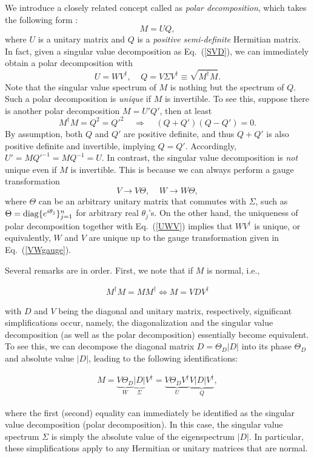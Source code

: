\documentclass{tADP2e}
\theoremstyle{plain}
\newcommand{\eqn}[1]{
\begin{eqnarray}
	#1
\end{eqnarray}
}
\theoremstyle{plain}
\theoremstyle{definition}
\begin{document}
We introduce a closely related concept called as \emph{polar decomposition}, which takes the following form \cite{BCH15}:
\begin{equation}
M=UQ,
\label{PD}
\end{equation}
where $U$ is a unitary matrix and $Q$ is a \emph{positive semi-definite} Hermitian matrix. In fact, given a singular value decomposition as Eq.~(\ref{SVD}), we can immediately obtain a polar decomposition with 
\begin{equation}
U=WV^\dag,\;\;\;\;Q=V\Sigma V^\dag\equiv \sqrt{M^\dag M}. 
\label{UWV}
\end{equation}
Note that the singular value spectrum of $M$ is nothing but the spectrum of $Q$. Such a polar decomposition is \emph{unique} if $M$ is invertible. To see this, suppose there is another polar decomposition $M=U'Q'$, then at least 
\begin{equation}
M^\dag M=Q^2=Q'^2\;\;\;\;\Rightarrow\;\;\;\; (Q+Q')(Q-Q')=0.
\end{equation}
By assumption, both $Q$ and $Q'$ are positive definite, and thus $Q+Q'$ is also positive definite and invertible, implying $Q=Q'$. Accordingly, $U'=MQ'^{-1}=MQ^{-1}=U$. In contrast, the singular value decomposition is \emph{not} unique even if $M$ is invertible. This is because we can always perform a gauge transformation
\begin{equation}
V\to V\Theta,\;\;\;\; W\to W\Theta,
\label{VWgauge}
\end{equation} 
where $\Theta$ can be an arbitrary unitary matrix that commutes with $\Sigma$, such as $\Theta={\rm diag}\{e^{i\theta_j}\}^n_{j=1}$ for arbitrary real $\theta_j$'s. On the other hand, the uniqueness of polar decomposition together with Eq.~(\ref{UWV}) implies that $WV^\dag$ is unique, or equivalently, $W$ and $V$ are unique up to the gauge transformation given in Eq.~(\ref{VWgauge}).

Several remarks are in order. First, we note that if $M$ is normal, i.e.,
\eqn{M^\dagger M=MM^\dagger\Leftrightarrow M=VDV^\dagger\label{2normalmat}}
with $D$ and $V$ being the diagonal and unitary matrix, respectively, significant simplifications occur, namely, the diagonalization and the singular value decomposition (as well as the polar decomposition) essentially become equivalent. To see this, we can decompose the diagonal matrix $D=\Theta_D|D|$ into its phase $\Theta_D$ and absolute value $|D|$, leading to the following identifications:
\eqn{
M=\underbrace{V\Theta_D}_{W}\underbrace{|D|}_{\Sigma}V^\dagger=\underbrace{V\Theta_DV^\dagger}_{U}\underbrace{V|D|V^\dagger}_{Q},
}
where the first (second) equality can immediately be identified as the singular value decomposition (polar decomposition).
In this case, the singular value spectrum $\Sigma$ is simply the absolute value of the eigenspectrum $|D|$. 
In particular, these simplifications apply to any Hermitian or unitary matrices that are normal.
\end{document}
